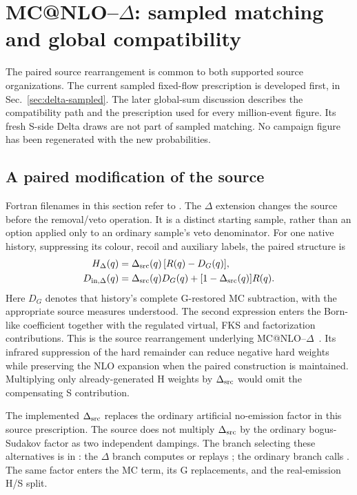 \section{MC@NLO--\texorpdfstring{$\Delta$}{Delta}: sampled matching and global compatibility}
\label{sec:delta-extension}

The paired source rearrangement is common to both supported source
organizations. The current sampled fixed-flow prescription is developed
first, in Sec.~\ref{sec:delta-sampled}. The later global-sum discussion
describes the compatibility path and the prescription used for every
million-event figure. Its fresh S-side Delta draws are not part of
sampled matching. No campaign figure has been regenerated with the new
probabilities.

\subsection{A paired modification of the source}
\label{sec:delta-paired}

Fortran filenames in this section refer to
.
The $\Delta$ extension changes the source before the removal/veto operation.
It is a distinct starting sample, rather than an option applied only to
an ordinary sample's veto denominator.
For one native history, suppressing its colour, recoil and auxiliary labels,
the paired structure is
\begin{align}
 H_\Delta(q)&=\Delta_{\rm src}(q)\,[R(q)-D_G(q)],
 \label{eq:delta-paired-h}\\
 D_{{\rm in},\Delta}(q)
   &=\Delta_{\rm src}(q)D_G(q)
       +[1-\Delta_{\rm src}(q)]R(q).
 \label{eq:delta-paired-s}
\end{align}
Here $D_G$ denotes that history's complete G-restored MC subtraction,
with the appropriate source measures understood.
The second expression enters the Born-like coefficient together with
the regulated virtual, FKS and factorization contributions.
This is the source rearrangement underlying
MC@NLO--$\Delta$~\cite{DeltaMatching}.
Its infrared suppression of the hard remainder can reduce negative
hard weights while preserving the NLO expansion when the paired
construction is maintained.
Multiplying only already-generated H weights by $\Delta_{\rm src}$
would omit the compensating S contribution.

The implemented $\Delta_{\rm src}$ replaces the ordinary artificial
no-emission factor in this source prescription.
The source does not multiply $\Delta_{\rm src}$ by the ordinary
bogus-Sudakov factor as two independent dampings.
The branch selecting these alternatives is
 in
:
the $\Delta$ branch computes or replays ;
the ordinary branch calls .
The same factor enters the MC term, its G replacements, and the
real-emission H/S split.


